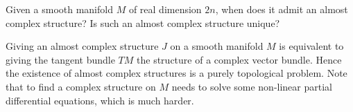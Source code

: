
\begin{question}\label{qs:existence_of_almost_complex_structure}
	Given a smooth manifold \(M\) of real dimension \(2n\), when does it admit an almost complex structure?
	Is such an almost complex structure unique?
\end{question}

Giving an almost complex structure \(J\) on a smooth manifold \(M\) is equivalent to giving the tangent bundle \(TM\) the structure of a complex vector bundle.
Hence the existence of almost complex structures is a purely topological problem.
Note that to find a complex structure on \(M\) needs to solve some non-linear partial differential equations, which is much harder.

